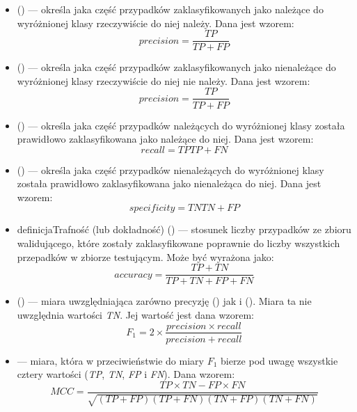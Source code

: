 	\begin{itemize}
		\item {} () --- określa jaka część przypadków zaklasyfikowanych jako należące do wyróżnionej klasy rzeczywiście do niej należy. Dana jest wzorem:
		 $$ precision = \frac{TP}{TP+FP} $$
		 
		\item {} () --- określa jaka część przypadków zaklasyfikowanych jako nienależące do wyróżnionej klasy rzeczywiście do niej nie należy. Dana jest wzorem:
		 $$ precision = \frac{TP}{TP+FP} $$		 
		 
		
		\item {} () --- określa jaka część przypadków należących do wyróżnionej klasy została prawidłowo zaklasyfikowana jako należące do niej. Dana jest wzorem:
		$$ recall = {TP}{TP+FN} $$
		
		\item {} () --- określa jaka część przypadków nienależących do wyróżnionej klasy została prawidłowo zaklasyfikowana jako nienależąca do niej. Dana jest wzorem:
		$$ specificity = {TN}{TN+FP} $$

		\item definicja{Trafność }(lub dokładność) () --- stosunek liczby przypadków ze zbioru walidującego, które zostały zaklasyfikowane poprawnie do liczby wszystkich przepadków w zbiorze testującym. Może być wyrażona jako:
		$$ accuracy = \frac{TP+TN}{TP+TN+FP+FN} $$

		\item {} () --- miara uwzględniająca zarówno precyzję () jak i  (). Miara ta nie uwzględnia wartości \emph{TN}. Jej wartość jest dana wzorem:
		$$ F_{1} = 2 \times \frac{precision \times recall}{precision + recall} $$
		 
		
		\item {} --- miara, która w przeciwieństwie do miary $ F_{1} $ bierze pod uwagę wszystkie cztery wartości (\emph{TP}, \emph{TN}, \emph{FP} i \emph{FN}). Dana wzorem: 
		$$ MCC = \frac{ TP \times TN - FP \times FN } {\sqrt{ (TP + FP) ( TP + FN ) ( TN + FP ) ( TN + FN ) } } $$
		

\end{itemize}

